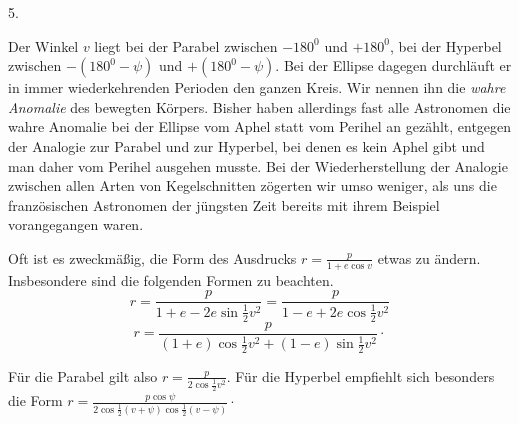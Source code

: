 \par{}
\begin{center}
5.
\end{center}
Der Winkel $v$ liegt bei der Parabel zwischen $-180^0$ und $+180^0$, bei der Hyperbel zwischen $-(180^0-\psi)$ und $+(180^0-\psi)$. Bei der Ellipse dagegen durchläuft er in immer wiederkehrenden Perioden den ganzen Kreis. Wir nennen ihn die \emph{wahre Anomalie} des bewegten Körpers. Bisher haben allerdings fast alle Astronomen die wahre Anomalie bei der Ellipse vom Aphel statt vom Perihel an gezählt, entgegen der Analogie zur Parabel und zur Hyperbel, bei denen es kein Aphel gibt und man daher vom Perihel ausgehen musste. Bei der Wiederherstellung der Analogie zwischen allen Arten von Kegelschnitten
zögerten wir umso weniger, als uns die französischen Astronomen der jüngsten Zeit bereits mit ihrem Beispiel vorangegangen waren.

Oft ist es zweckmäßig, die Form des Ausdrucks $r = \frac{p}{1+e\cos v}$ etwas zu ändern. Insbesondere sind die folgenden Formen zu beachten.
\[
r = \frac{p}{1+e-2e\sin\frac{1}{2}v^2} = \frac{p}{1-e+2e\cos\frac{1}{2}v^2}
\]
\[
r = \frac{p}{(1+e)\cos\frac{1}{2}v^2+(1-e)\sin\frac{1}{2}v^2}\cdot
\]

Für die Parabel gilt also $r = \frac{p}{2\cos\frac{1}{2}v^2}$. Für die Hyperbel empfiehlt sich besonders die Form $r = \frac{p\cos\psi}{2\cos\frac{1}{2}(v+\psi)\cos\frac{1}{2}(v-\psi)}\cdot$
